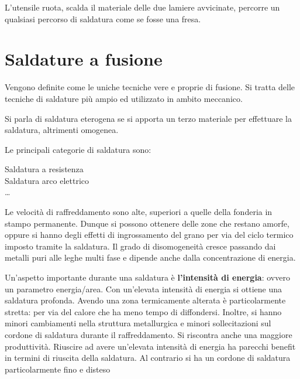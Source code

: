 L'utensile ruota, scalda il materiale delle due lamiere avvicinate, percorre un qualsiasi percorso di saldatura come se fosse una fresa. 

\section{Saldature a fusione}
Vengono definite come le uniche tecniche vere e proprie di fusione.
Si tratta delle tecniche di saldature più ampio ed utilizzato in ambito meccanico.

Si parla di saldatura eterogena se si apporta un terzo materiale per effettuare la saldatura, altrimenti omogenea.

Le principali categorie di saldatura sono:
\begin{description}
\item[Saldatura a resistenza]
\item[Saldatura arco elettrico]
\item[\dots]\todo{\\aggiungere}
\end{description}

Le velocità di raffreddamento sono alte, superiori a quelle della fonderia in stampo permanente. Dunque si possono ottenere delle zone che restano amorfe, oppure si hanno degli effetti di ingrossamento del grano per via del ciclo termico imposto tramite la saldatura.
Il grado di disomogeneità cresce passando dai metalli puri alle leghe multi fase e dipende anche dalla concentrazione di energia.

Un'aspetto importante durante una saldatura è \textbf{l'intensità di energia}: ovvero un parametro energia/area.
Con un'elevata intensità di energia si ottiene una saldatura profonda. Avendo una zona termicamente alterata è particolarmente stretta: per via del calore che ha meno tempo di diffondersi.
Inoltre, si hanno minori cambiamenti nella struttura metallurgica e minori sollecitazioni sul cordone di saldatura durante il raffreddamento.
Si riscontra anche una maggiore produttività.
Riuscire ad avere un'elevata intensità di energia ha parecchi benefit in termini di riuscita della saldatura.
Al contrario si ha un cordone di saldatura particolarmente fino e disteso

